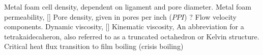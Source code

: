 \documentclass[asme2ejs.tex]{subfiles}
\begin{document}
\begin{nomenclature}

 {Metal foam cell density, dependent on ligament and pore diameter.}
 {Metal foam permeability, [\metre\squared]}
\entry{$\phi$} {Pore density, given in pores per inch ($PPI$) }
\entry{$\beta$} {?}
 {Flow  velocity components.}
\entry{$\mu$} {Dynamic viscosity, [\newton\second\per\meter\squared ]}
\entry{$\nu$} {Kinematic viscosity, \metre\per\second\squared}
 {An abbreviation for a tetrakaidecaheron, also referred to as a truncated octahedron or Kelvin structure.}
 {Critical heat flux transition to film boiling (crisis boiling)}

\end{nomenclature}
\end{document}
